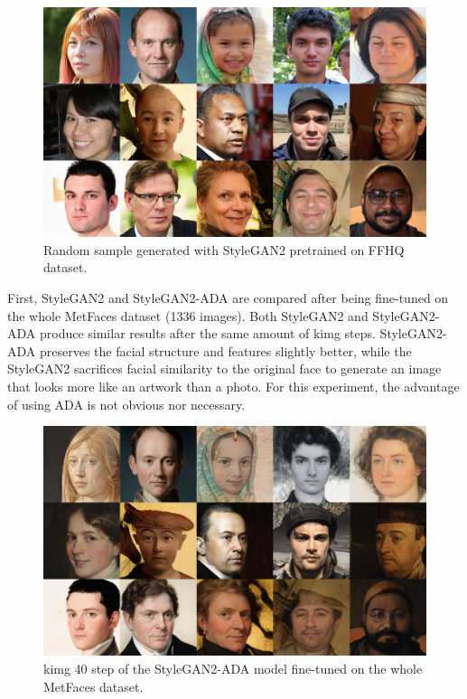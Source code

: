 \documentclass[conference]{IEEEtran}
\begin{document}
\begin{figure}[!h]
	\begin{center}
		\includegraphics[width=1\columnwidth]{./images/picked_images/stylegan2_beginning.png}
		\caption{Random sample generated with StyleGAN2 pretrained on FFHQ dataset.}
		\label{fig:figure5}
	\end{center}
\end{figure}

First, StyleGAN2 and StyleGAN2-ADA are compared after being fine-tuned on the whole MetFaces dataset (1336 images). Both StyleGAN2 and StyleGAN2-ADA produce similar results after the same amount of kimg steps. StyleGAN2-ADA preserves the facial structure and features slightly better, while the StyleGAN2 sacrifices facial similarity to the original face to generate an image that looks more like an artwork than a photo. For this experiment, the advantage of using ADA is not obvious nor necessary.

\begin{figure}[!h]
	\begin{center}
		\includegraphics[width=1\columnwidth]{./images/picked_images/stylegan2_ADA_step_40_full_dataset.png}
		\caption{kimg 40 step of the StyleGAN2-ADA model fine-tuned on the whole MetFaces dataset.}
		\label{fig:figure6}
	\end{center}
\end{figure}
\end{document}
